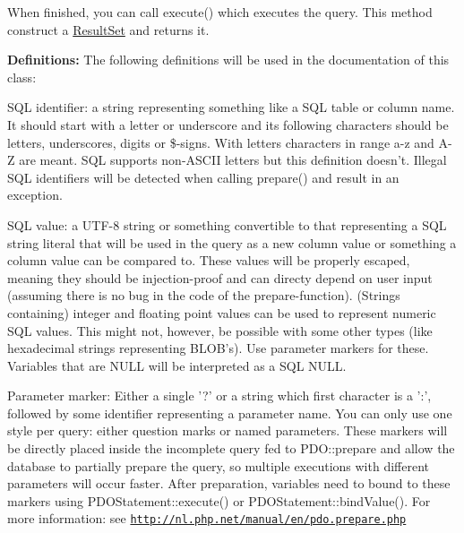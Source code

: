 When finished, you can call execute() which executes the query. This method construct a \hyperlink{classResultSet}{ResultSet} and returns it.

{\bfseries Definitions:} The following definitions will be used in the documentation of this class:


\begin{DoxyItemize}
\item SQL identifier: a string representing something like a SQL table or column name. It should start with a letter or underscore and its following characters should be letters, underscores, digits or \$-\/signs. With letters characters in range a-\/z and A-\/Z are meant. SQL supports non-\/ASCII letters but this definition doesn't. Illegal SQL identifiers will be detected when calling prepare() and result in an exception.
\end{DoxyItemize}


\begin{DoxyItemize}
\item SQL value: a UTF-\/8 string or something convertible to that representing a SQL string literal that will be used in the query as a new column value or something a column value can be compared to. These values will be properly escaped, meaning they should be injection-\/proof and can directy depend on user input (assuming there is no bug in the code of the prepare-\/function). (Strings containing) integer and floating point values can be used to represent numeric SQL values. This might not, however, be possible with some other types (like hexadecimal strings representing BLOB's). Use parameter markers for these. Variables that are NULL will be interpreted as a SQL NULL.
\end{DoxyItemize}


\begin{DoxyItemize}
\item Parameter marker: Either a single '?' or a string which first character is a ':', followed by some identifier representing a parameter name. You can only use one style per query: either question marks or named parameters. These markers will be directly placed inside the incomplete query fed to PDO::prepare and allow the database to partially prepare the query, so multiple executions with different parameters will occur faster. After preparation, variables need to bound to these markers using PDOStatement::execute() or PDOStatement::bindValue(). For more information: see \href{http://nl.php.net/manual/en/pdo.prepare.php}{\tt http://nl.php.net/manual/en/pdo.prepare.php}
\end{DoxyItemize}

